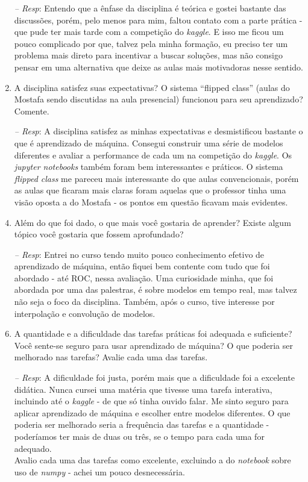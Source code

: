\documentclass[12pt]{article}
\begin{document}
\begin{enumerate}
\begin{enumerate}
		\item[\textit{-- Resp}:] Entendo que a ênfase da disciplina é teórica e gostei bastante das discussões, porém, pelo menos para mim, faltou contato com a parte prática - que pude ter mais tarde com a competição do \textit{kaggle}. E isso me ficou um pouco complicado por que, talvez pela minha formação, eu preciso ter um problema mais direto para incentivar a buscar soluções, mas não consigo pensar em uma alternativa que deixe as aulas mais motivadoras nesse sentido.		
		\item A disciplina satisfez suas expectativas? O sistema ``flipped class'' (aulas do Mostafa sendo
		discutidas na aula presencial) funcionou para seu aprendizado? Comente.
		\item[\textit{-- Resp}:] A disciplina satisfez as minhas expectativas e desmistificou bastante o que é aprendizado de máquina. Consegui construir uma série de modelos diferentes e avaliar a performance de cada um na competição do \textit{kaggle}. Os \textit{jupyter notebooks} também foram bem interessantes e práticos. O sistema \textit{flipped class} me pareceu mais interessante do que aulas convencionais, porém as aulas que ficaram mais claras foram aquelas que o professor tinha uma visão oposta a do Mostafa - os pontos em questão ficavam mais evidentes.		
		\item Além do que foi dado, o que mais você gostaria de aprender? Existe algum tópico você gostaria que fossem aprofundado?
		\item[\textit{-- Resp}:] Entrei no curso tendo muito pouco conhecimento efetivo de aprendizado de máquina, então fiquei bem contente com tudo que foi abordado - até ROC, nessa avaliação. Uma curiosidade minha, que foi abordada por uma das palestras, é sobre modelos em tempo real, mas talvez não seja o foco da disciplina. Também, após o curso, tive interesse por interpolação e convolução de modelos.				
		\item A quantidade e a dificuldade das tarefas práticas foi adequada e suficiente? Você sente-se seguro para usar aprendizado de máquina? O que poderia ser melhorado nas tarefas? Avalie cada uma das tarefas.
		\item[\textit{-- Resp}:] A dificuldade foi justa, porém mais que a dificuldade foi a excelente didática. Nunca cursei uma matéria que tivesse uma tarefa interativa, incluindo até o \textit{kaggle} - de que só tinha ouvido falar. Me sinto seguro para aplicar aprendizado de máquina e escolher entre modelos diferentes. O que poderia ser melhorado seria a frequência das tarefas e a quantidade - poderíamos ter mais de duas ou três, se o tempo para cada uma for adequado.\\
		Avalio cada uma das tarefas como excelente, excluindo a do \textit{notebook} sobre uso de \textit{numpy} - achei um pouco desnecessária.			
		

\end{enumerate}
\end{enumerate}
\end{document}
